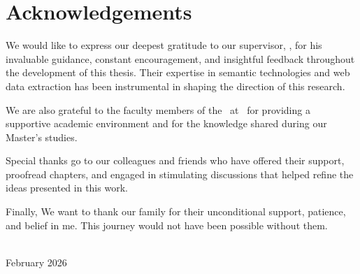 \chapter*{Acknowledgements}

We would like to express our deepest gratitude to our supervisor, \SupervisorName, for his invaluable guidance, constant encouragement, and insightful feedback throughout the development of this thesis. Their expertise in semantic technologies and web data extraction has been instrumental in shaping the direction of this research.

We are also grateful to the faculty members of the \DepartmentName\ at \UniversityName\ for providing a supportive academic environment and for the knowledge shared during our Master's studies.

Special thanks go to our colleagues and friends who have offered their support, proofread chapters, and engaged in stimulating discussions that helped refine the ideas presented in this work.

Finally, We want to thank our family for their unconditional support, patience, and belief in me. This journey would not have been possible without them.

\vspace{1.5cm}

\begin{flushright}
  \AuthorName \\
  February 2026
\end{flushright}
